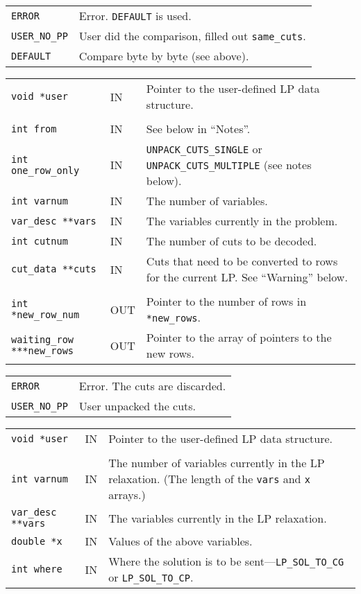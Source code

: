 \documentclass[twoside,11pt]{article}
\begin{document}
{\newpage
\clearpage
\samepage \begin{tabular}{lp{295.386pt}}
{\tt ERROR} & Error. {\tt DEFAULT} is used.\\ 
{\tt USER\_NO\_PP} & User did the comparison, filled out {\tt *same\_cuts}. \\ 
{\tt DEFAULT} & Compare byte by byte (see above). \\ 
\end{tabular}
}

{\newpage
\clearpage
\samepage \begin{tabular}{llp{252.085pt}}
{\tt void *user} & IN & Pointer to the user-defined LP data structure. \\ 
& & \\ 
{\tt int from} & IN & See below in ``Notes''. \\ 
{\tt int one\_row\_only} & IN & {\tt UNPACK\_CUTS\_SINGLE} or {\tt
UNPACK\_CUTS\_MULTIPLE} (see notes below). \\ 
{\tt int varnum} & IN & The number of variables. \\ 
{\tt var\_desc **vars} & IN & The variables currently in the problem. \\ 
{\tt int cutnum} & IN & The number of cuts to be decoded. \\ 
{\tt cut\_data **cuts} & IN & Cuts that need to be converted to rows
for the current LP. See ``Warning'' below. \\ 
& & \\ 
{\tt int *new\_row\_num} & OUT & Pointer to the number of rows in
{\tt **new\_rows}. \\ 
{\tt waiting\_row ***new\_rows} & OUT & Pointer to the array of
pointers to the new rows. \\ 
\end{tabular}
}

{\newpage
\clearpage
\samepage \begin{tabular}{lp{371.195pt}}
{\tt ERROR} & Error. The cuts are discarded.\\ 
{\tt USER\_NO\_PP} & User unpacked the cuts.\\ 
\end{tabular}
}

{\newpage
\clearpage
\samepage \begin{tabular}{llp{297.864pt}}
{\tt void *user} &  IN & Pointer to the user-defined LP data structure. \\ 
& & \\ 
{\tt int varnum} & IN & The number of variables currently in the LP
relaxation. (The length of the {\tt *vars} and {\tt x} arrays.) \\ 
{\tt var\_desc **vars} & IN & The variables currently in the LP relaxation.\\ 
{\tt double *x} & IN & Values of the above variables.\\ 
{\tt int where} & IN & Where the solution is to be sent---{\tt LP\_SOL\_TO\_CG} or {\tt LP\_SOL\_TO\_CP}. \\ 
\end{tabular}
}
\end{document}
